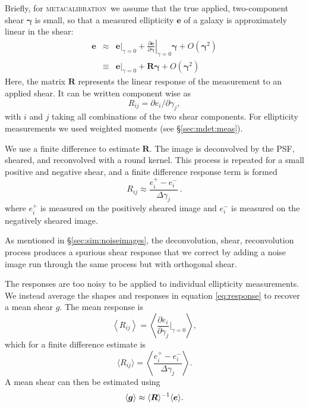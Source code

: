 \documentclass[twocolumn,twocolappendix,astrosym]{openjournal}
\newcommand{\vecg}{\mbox{\boldmath $g$}}
\newcommand{\mcal}{\textsc{metacalibration}}
\begin{document}
Briefly, for \mcal\ we assume that the true applied, two-component shear
$\boldsymbol{\gamma}$ is small, so that a measured ellipticity $\boldsymbol{e}$
of a galaxy is approximately linear in the shear:
\begin{eqnarray} \label{eq:response}
\boldsymbol{e} & \approx & \left.\boldsymbol{e}\right|_{\gamma=0} +
                           \left.\frac{\partial \boldsymbol{e}}{\partial\boldsymbol\gamma}\right|_{\gamma=0} \boldsymbol\gamma +
                           O(\boldsymbol\gamma^2)\nonumber\\
               & \equiv  & \left.\boldsymbol{e}\right|_{\gamma=0} +
                           \boldsymbol{R} \boldsymbol\gamma +
                           O(\boldsymbol\gamma^2)
\end{eqnarray}
Here, the matrix $\boldsymbol{R}$ represents the linear response of the
measurement to an applied shear. It can be written component wise as
\begin{equation}
R_{ij}=\partial e_i /\partial \gamma_j,
\end{equation}
with $i$ and $j$ taking all combinations of the two shear components.  For ellipticity
measurements we used weighted moments (see \S \ref{sec:mdet:meas}).

We use a finite difference to estimate $\boldsymbol{R}$.  The image is
deconvolved by the PSF, sheared, and reconvolved with a round kernel.  This
process is repeated for a small positive and negative shear, and a finite
difference response term is formed
\begin{equation}
R_{ij} \approx \frac{e_i^{+} - e_i^{-}}{\Delta\gamma_j}\ .
\end{equation}
where $e_i^{+}$ is measured on the positively sheared image and $e_i^{-}$ is
measured on the negatively sheared image.

As mentioned in \S \ref{sec:sim:noiseimages}, the deconvolution, shear,
reconvolution process produces a spurious shear response that we correct by
adding a noise image run through the same process but with orthogonal shear.

The responses are too noisy to be applied to individual ellipticity measurements.
We instead average the shapes and responses in equation \ref{eq:response} to
recover a mean shear \vecg.  The mean response is
\begin{equation}
    \left< R_{ij} \right> = \left< \frac{\partial e_i }{\partial \gamma_j } \biggr\rvert_{\gamma=0} \right>,
\end{equation}
which for a finite difference estimate is
\begin{equation}
    \langle R_{ij}\rangle = \left< \frac{e_i^{+} - e_i^{-}}{\Delta\gamma_j} \right>.
\end{equation}
A mean shear can then be estimated using
\begin{equation} \label{eq:shearmeas}
    \langle \vecg \rangle \approx \langle \boldsymbol{R}\rangle^{-1}\langle\boldsymbol{e}\rangle.
\end{equation}
\end{document}
